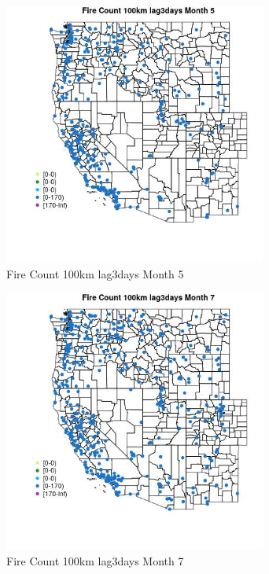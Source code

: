 \begin{figure} 
\centering  
\includegraphics[width=0.77\textwidth]{Code_Outputs/Report_ML_input_PM25_Step4_part_e_de_duplicated_aves_compiled_2019-05-18wNAs_MapObsMo5Fire_Count_100km_lag3days.jpg} 
\caption{\label{fig:Report_ML_input_PM25_Step4_part_e_de_duplicated_aves_compiled_2019-05-18wNAsMapObsMo5Fire_Count_100km_lag3days}Fire Count 100km lag3days Month 5} 
\end{figure} 
 

\begin{figure} 
\centering  
\includegraphics[width=0.77\textwidth]{Code_Outputs/Report_ML_input_PM25_Step4_part_e_de_duplicated_aves_compiled_2019-05-18wNAs_MapObsMo7Fire_Count_100km_lag3days.jpg} 
\caption{\label{fig:Report_ML_input_PM25_Step4_part_e_de_duplicated_aves_compiled_2019-05-18wNAsMapObsMo7Fire_Count_100km_lag3days}Fire Count 100km lag3days Month 7} 
\end{figure} 
 

